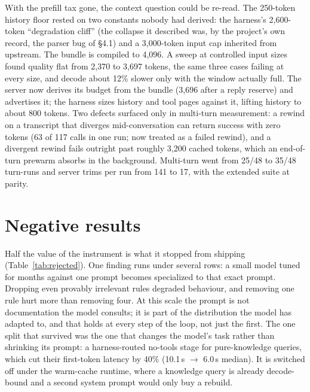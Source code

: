 \documentclass[11pt]{article}
\begin{document}
With the prefill tax gone, the context question could be re-read. The
250-token history floor rested on two constants nobody had derived: the
harness's 2{,}600-token ``degradation cliff'' (the collapse it described was,
by the project's own record, the parser bug of \S4.1) and a 3{,}000-token
input cap inherited from upstream. The bundle is compiled to 4{,}096. A sweep
at controlled input sizes found quality flat from 2{,}370 to 3{,}697 tokens,
the same three cases failing at every size, and decode about 12\% slower
only with the window actually full. The server now derives its budget from
the bundle (3{,}696 after a reply reserve) and advertises it; the harness
sizes history and tool pages against it, lifting history to about 800
tokens. Two defects surfaced only in multi-turn measurement: a rewind on a
transcript that diverges mid-conversation can return success with zero
tokens (63 of 117 calls in one run; now treated as a failed rewind), and a
divergent rewind fails outright past roughly 3{,}200 cached tokens, which an
end-of-turn prewarm absorbs in the background. Multi-turn went from 25/48 to
35/48 turn-runs and server trims per run from 141 to 17, with the extended
suite at parity.

\section{Negative results}
\label{sec:negative}

Half the value of the instrument is what it stopped from shipping
(Table~\ref{tab:rejected}). One finding runs under several rows: a small
model tuned for months against one prompt becomes specialized to that exact
prompt. Dropping even provably irrelevant rules degraded behaviour, and
removing one rule hurt more than removing four. At this scale the prompt is
not documentation the model consults; it is part of the distribution the
model has adapted to, and that holds at every step of the loop, not just the
first. The one split that survived was the one that changes the model's task
rather than shrinking its prompt: a harness-routed no-tools stage for
pure-knowledge queries, which cut their first-token latency by 40\%
(10.1\,s $\to$ 6.0\,s median). It is switched off under the warm-cache
runtime, where a knowledge query is already decode-bound and a second system
prompt would only buy a rebuild.
\end{document}
